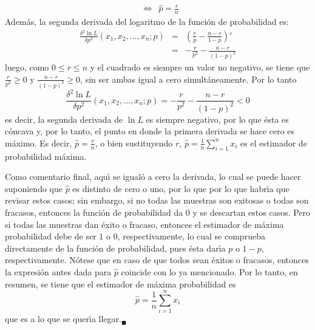 \begin{solucion}
\begin{eqnarray*}
  & \Leftrightarrow & \hat{p} = \frac{r}{n}
 \end{eqnarray*}
 Adem\'as, la segunda derivada del logaritmo de la funci\'on de probabilidad es:
 \begin{eqnarray*}
  \frac{\delta^2 \ln L}{\delta p^2} \left( x_1, x_2, \ldots, x_n; p \right) & = & \left( \frac{r}{p} - \frac{n-r}{1-p} \right)' \\
  & = & -\frac{r}{p^2} - \frac{n-r}{(1-p)^2}
 \end{eqnarray*}
 luego, como $0 \leq r \leq n$ y el cuadrado es siempre un valor no negativo, se tiene que
 $\frac{r}{p^2} \geq 0$ y $\frac{n-r}{(1-p)^2} \geq 0$, sin ser ambas igual a cero simult\'aneamente. Por lo tanto
 \begin{equation*}
  \frac{\delta^2 \ln L}{\delta p^2} \left( x_1, x_2, \ldots, x_n; p \right) = -\frac{r}{p^2} - \frac{n-r}{(1-p)^2} < 0
 \end{equation*}
 es decir, la segunda derivada de $\ln L$ es siempre negativo, por lo que \'esta es c\'oncava y, por lo tanto, el punto en donde la primera derivada se hace cero es m\'aximo. Es decir, $\hat{p} = \frac{r}{n}$, o bien sustituyendo $r$, $\hat{p} = \frac{1}{n} \sum_{i=1}^n x_i$ es el estimador de probabilidad m\'axima.
 \par 
 Como comentario final, aqu\'{\i} se igual\'o a cero la derivada, lo cual se puede hacer suponiendo que $\hat{p}$ es distinto de cero o uno, por lo que por lo que habr\'{\i}a que revisar estos casos; sin embargo, si no todas las muestras son exitosas o todas son fracasos, entonces la funci\'on de probabilidad da $0$ y se descartan estos casos. Pero si todas las muestras dan \'exito o fracaso, entonces el estimador de m\'axima probabilidad debe de ser $1$ o $0$, respectivamente, lo cual se comprueba directamente de la funci\'on de probabilidad, pues \'esta dar\'{\i}a $p$ o $1-p$, respectivamente. N\'otese que en caso de que todos sean \'exitos o fracasos, entonces la expresi\'on antes dada para $\hat{p}$ coincide con lo ya mencionado. Por lo tanto, en resumen, se tiene que el estimador de m\'axima probabilidad es
 \begin{equation*}
  \hat{p} = \frac{1}{n} \sum_{i=1}^{n} x_i
 \end{equation*}
 que es a lo que se quer\'{\i}a llegar.${}_{\blacksquare}$
\end{solucion}
